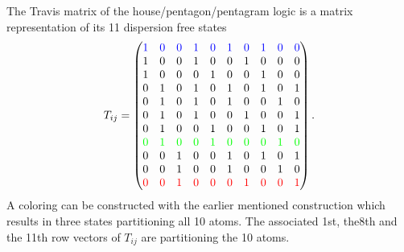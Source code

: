 \documentclass[%
  reprint,
  twocolumn,
 showpacs,
 showkeys,
 preprintnumbers,
 amsmath,amssymb,
 aps,
 pra,
  longbibliography,
 ]{revtex4-1}
\begin{document}
The Travis matrix of the house/pentagon/pentagram logic
is a matrix representation of its 11 dispersion free states~\cite{wright:pent}
\begin{equation}
T_{ij}=\begin{pmatrix}
{\color{blue}1}& {\color{blue}0}& {\color{blue}0}& {\color{blue}1}& {\color{blue}0}& {\color{blue}1}& {\color{blue}0}& {\color{blue}1}& {\color{blue}0}& {\color{blue}0}  \\
1& 0& 0& 1& 0& 0& 1& 0& 0& 0  \\
1& 0& 0& 0& 1& 0& 0& 1& 0& 0  \\
0& 1& 0& 1& 0& 1& 0& 1& 0& 1  \\
0& 1& 0& 1& 0& 1& 0& 0& 1& 0  \\
0& 1& 0& 1& 0& 0& 1& 0& 0& 1  \\
0& 1& 0& 0& 1& 0& 0& 1& 0& 1  \\
{\color{green}0}& {\color{green}1}& {\color{green}0}& {\color{green}0}& {\color{green}1}& {\color{green}0}& {\color{green}0}& {\color{green}0}& {\color{green}1}& {\color{green}0}  \\
0& 0& 1& 0& 0& 1& 0& 1& 0& 1  \\
0& 0& 1& 0& 0& 1& 0& 0& 1& 0  \\
{\color{red}0}& {\color{red}0}& {\color{red}1}& {\color{red}0}& {\color{red}0}& {\color{red}0}& {\color{red}1}& {\color{red}0}& {\color{red}0}& {\color{red}1}
\end{pmatrix}
.
\end{equation}
A coloring can be constructed with the earlier mentioned construction
which results in three states partitioning all 10 atoms.
The associated 1st, the8th and the 11th row vectors
of $T_{ij}$  are partitioning the 10 atoms.
\end{document}
